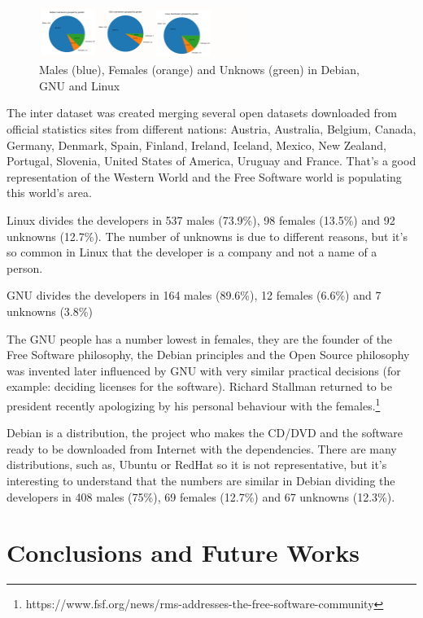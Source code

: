 \documentclass[a4paper]{article}
\begin{document}
\begin{figure}
  \centering
  \includegraphics[width=0.6\textwidth]{images/debian-gnu-linux.pdf}
  \caption[Caption for LOF]{Males (blue), Females (orange) and Unknows (green) in Debian, GNU and Linux}
\end{figure}

The inter dataset was created merging several open datasets downloaded
from official statistics sites from different nations: Austria,
Australia, Belgium, Canada, Germany, Denmark, Spain, Finland, Ireland,
Iceland, Mexico, New Zealand, Portugal, Slovenia, United States of
America, Uruguay and France. That's a good representation of the
Western World and the Free Software world is populating this world's
area\cite{gonzalez2008geographic}.

Linux divides the developers in 537 males (73.9\%), 98 females
(13.5\%) and 92 unknowns (12.7\%). The number of unknowns is due to
different reasons, but it's so common in Linux that the developer is a
company and not a name of a person.

GNU divides the developers in 164 males (89.6\%), 12 females (6.6\%)
and 7 unknowns (3.8\%)

The GNU people has a number lowest in females, they are the founder of
the Free Software philosophy, the Debian principles and the Open
Source philosophy was invented later influenced by GNU with very
similar practical decisions (for example: deciding licenses for the
software). Richard Stallman returned to be president recently
apologizing by his personal behaviour with the
females.\footnote{https://www.fsf.org/news/rms-addresses-the-free-software-community}

Debian is a distribution, the project who makes the CD/DVD and the
software ready to be downloaded from Internet with the
dependencies. There are many distributions, such as, Ubuntu or RedHat
so it is not representative, but it's interesting to understand that
the numbers are similar in Debian dividing the developers in 408 males
(75\%), 69 females (12.7\%) and 67 unknowns (12.3\%).


\section{Conclusions and Future Works}
\label{sec:conclusions}
\end{document}
